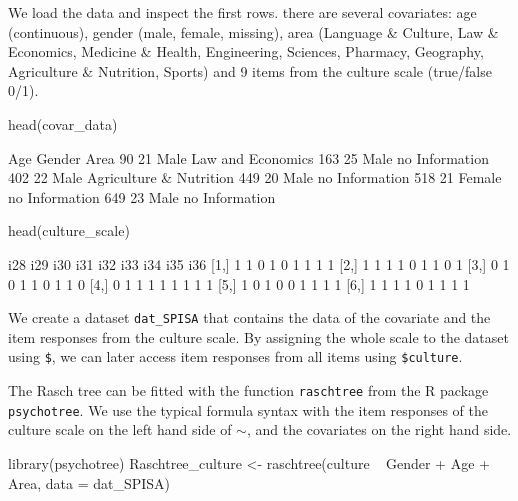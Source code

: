 \documentclass[doc,floatsintext,natbib]{apa7}
\begin{document}
We load the data and inspect the first rows. there are several covariates: age (continuous), gender (male, female, missing), area (Language \& Culture, Law \& Economics, Medicine \& Health, Engineering, Sciences, Pharmacy, Geography, Agriculture \& Nutrition, Sports) and 9 items from the culture scale (true/false 0/1). 




\begin{Schunk}
\begin{Sinput}
 head(covar_data)
\end{Sinput}
\begin{Soutput}
    Age Gender                    Area
90   21   Male       Law and Economics
163  25   Male          no Information
402  22   Male Agriculture & Nutrition
449  20   Male          no Information
518  21 Female          no Information
649  23   Male          no Information
\end{Soutput}
\begin{Sinput}
 head(culture_scale)
\end{Sinput}
\begin{Soutput}
     i28 i29 i30 i31 i32 i33 i34 i35 i36
[1,]   1   1   0   1   0   1   1   1   1
[2,]   1   1   1   1   0   1   1   0   1
[3,]   0   1   0   1   1   0   1   1   0
[4,]   0   1   1   1   1   1   1   1   1
[5,]   1   0   1   0   0   1   1   1   1
[6,]   1   1   1   1   0   1   1   1   1
\end{Soutput}
\end{Schunk}

We create a dataset \texttt{dat\_SPISA} that contains the data of the covariate and the item responses from the culture scale. By assigning the whole scale to the dataset using \texttt{\$}, we can later access item responses from all items using \texttt{\$culture}. 
\begin{Schunk}
\end{Schunk}

The Rasch tree can be fitted with the function \texttt{raschtree} from the R package \texttt{psychotree}. We use the typical formula syntax with the item responses of the culture scale on the left hand side of $\sim$, and the covariates on the right hand side. 



\begin{Schunk}
\begin{Sinput}
 library(psychotree)
 Raschtree_culture <- raschtree(culture ~  Gender + Age + Area,
                                data = dat_SPISA)
\end{Sinput}
\end{Schunk}
\end{document}
